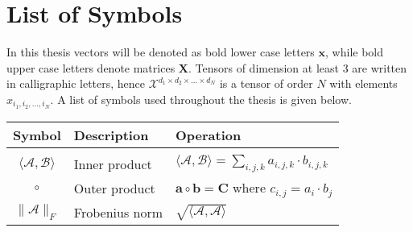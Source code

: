 \section{List of Symbols}

In this thesis vectors will be denoted as bold lower case letters $\boldsymbol{x}$, while bold upper case letters denote matrices $\boldsymbol{X}$. Tensors of dimension at least 3 are written in calligraphic letters, hence $\mathcal{X}^{d_1\times d_2 \times \dots \times d_N}$ is a tensor of order $N$ with elements $x_{i_1, i_2, \dots, i_N}$. A list of symbols used throughout the thesis is given below. 

\vspace{1cm}

\begin{tabular}{cll}
    \textbf{Symbol} & \textbf{Description} & \textbf{Operation}  \\ \hline
    & & \\
    $\langle \mathcal{A}, \mathcal{B}\rangle$ & Inner product & $\langle \mathcal{A}, \mathcal{B}\rangle = \sum_{i,j,k} a_{i,j,k}\cdot b_{i,j,k}$ \\
    $\circ$ &  Outer product & $\boldsymbol{a} \circ \boldsymbol{b} = \boldsymbol{C}$ where $c_{i,j} = a_i \cdot b_j$ \\
    $\| \mathcal{A} \|_F$ & Frobenius norm & $\sqrt{\langle \mathcal{A}, \mathcal{A}\rangle}$
    
\end{tabular}